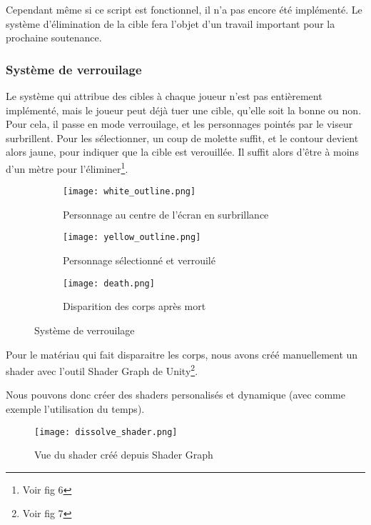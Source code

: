             Cependant même si ce script est fonctionnel, il n'a pas encore été implémenté. 
            Le système d'élimination de la cible fera l'objet d'un travail important pour la prochaine soutenance.
        
        
        \subsubsection{Système de verrouilage}
            
            Le système qui attribue des cibles à chaque joueur n'est pas entièrement implémenté, mais le joueur peut déjà tuer une cible, qu'elle soit la bonne ou non.
            Pour cela, il passe en mode verrouilage, et les personnages pointés par le viseur surbrillent.
            Pour les sélectionner, un coup de molette suffit, et le contour devient alors jaune, pour indiquer que la cible est verouillée.
            Il suffit alors d'être à moins d'un mètre pour l'éliminer\footnote{Voir fig 6}.

            \begin{figure}[hbt!]
                \centering
                \begin{subfigure}[b]{0.3\textwidth}
                    \texttt{[image: white\_outline.png]} 
                    \caption{Personnage au centre de l'écran en surbrillance}
                \end{subfigure}
                \hspace{150pt}
                \begin{subfigure}[b]{0.3\textwidth}
                    \texttt{[image: yellow\_outline.png]} 
                    \caption{Personnage sélectionné et verrouilé}
                \end{subfigure}

                \begin{subfigure}[b]{0.3\textwidth}
                    \texttt{[image: death.png]} 
                    \caption{Disparition des corps après mort}
                \end{subfigure}
                \caption{Système de verrouilage}
            \end{figure}

            Pour le matériau qui fait disparaitre les corps, nous avons créé manuellement un shader avec l'outil Shader Graph de Unity\footnote{Voir fig 7}.

            Nous pouvons donc créer des shaders personalisés et dynamique (avec comme exemple l'utilisation du temps).

            \begin{figure}[hbt!]
                \centering
                \texttt{[image: dissolve\_shader.png]} 
                \caption{Vue du shader créé depuis Shader Graph}
            \end{figure}